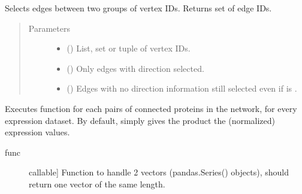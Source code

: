 \documentclass[letterpaper,10pt,english]{sphinxmanual}
\begin{document}
\begin{fulllineitems}

\begin{fulllineitems}
\label{\detokenize{reference:pypath.main.PyPath.edges_between}}
Selects edges between two groups of vertex IDs.
Returns set of edge IDs.
\begin{quote}\begin{description}
\item[{Parameters}] \leavevmode\begin{itemize}
\item {} 
\sphinxstyleliteralstrong{\sphinxupquote{,}} () \textendash{} List, set or tuple of vertex IDs.

\item {} 
 () \textendash{} Only edges with direction  selected.

\item {} 
 () \textendash{} Edges with no direction information still selected even if
 is .

\end{itemize}

\end{description}\end{quote}

\end{fulllineitems}


\begin{fulllineitems}
\label{\detokenize{reference:pypath.main.PyPath.edges_expression}}
Executes function  for each pairs of connected proteins in the
network, for every expression dataset. By default,  simply
gives the product the (normalized) expression values.
\begin{description}
\item[{func}] \leavevmode{[}callable{]}
Function to handle 2 vectors (pandas.Series() objects), should
return one vector of the same length.


\end{description}
\end{fulllineitems}
\end{fulllineitems}
\end{document}
